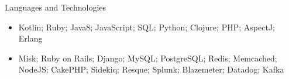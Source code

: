 \documentclass[includefoot]{mcdowellcv}
\begin{document}
	\begin{cvsection}{Languages and Technologies}
		\begin{cvsubsection}{}{}{}	
			\begin{itemize}
				\item Kotlin; Ruby; Java8; JavaScript; SQL; Python; Clojure; PHP; AspectJ; Erlang 
				\item Misk; Ruby on Rails; Django; MySQL; PostgreSQL; Redis; Memcached; NodeJS; CakePHP; Sidekiq; Resque; Splunk; Blazemeter; Datadog; Kafka
			\end{itemize}
		\end{cvsubsection}
	\end{cvsection}
\end{document}
